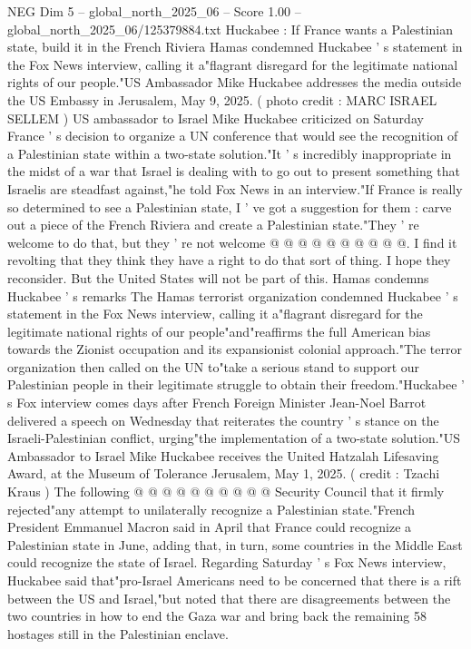 \begin{textsample}{NEG Dim 5 – global\_north\_2025\_06 – Score 1.00 – global\_north\_2025\_06/125379884.txt}  \label{ex:f5_neg_389}
Huckabee : If France wants a Palestinian state, build it in the French Riviera Hamas condemned Huckabee ' s statement in the Fox News interview, calling it a"flagrant disregard for the legitimate national rights of our people."US Ambassador Mike Huckabee addresses the media outside the US Embassy in Jerusalem, May 9, 2025. ( photo credit : MARC ISRAEL SELLEM ) US ambassador to Israel Mike Huckabee criticized on Saturday France ' s decision to organize a UN conference that would see the recognition of a Palestinian state within a two-state solution."It ' s incredibly inappropriate in the midst of a war that Israel is dealing with to go out to present something that Israelis are steadfast against,"he told Fox News in an interview."If France is really so determined to see a Palestinian state, I ' ve got a suggestion for them : carve out a piece of the French Riviera and create a Palestinian state."They ' re welcome to do that, but they ' re not welcome @ @ @ @ @ @ @ @ @ @.
I find it revolting that they think they have a right to do that sort of thing.
I hope they reconsider.
But the United States will not be part of this.
Hamas condemns Huckabee ' s remarks The Hamas terrorist organization condemned Huckabee ' s statement in the Fox News interview, calling it a"flagrant disregard for the legitimate national rights of our people"and"reaffirms the full American bias towards the Zionist occupation and its expansionist colonial approach."The terror organization then called on the UN to"take a serious stand to support our Palestinian people in their legitimate struggle to obtain their freedom."Huckabee ' s Fox interview comes days after French Foreign Minister Jean-Noel Barrot delivered a speech on Wednesday that reiterates the country ' s stance on the Israeli-Palestinian conflict, urging"the implementation of a two-state solution."US Ambassador to Israel Mike Huckabee receives the United Hatzalah Lifesaving Award, at the Museum of Tolerance Jerusalem, May 1, 2025. ( credit : Tzachi Kraus ) The following @ @ @ @ @ @ @ @ @ @ Security Council that it firmly rejected"any attempt to unilaterally recognize a Palestinian state."French President Emmanuel Macron said in April that France could recognize a Palestinian state in June, adding that, in turn, some countries in the Middle East could recognize the state of Israel.
Regarding Saturday ' s Fox News interview, Huckabee said that"pro-Israel Americans need to be concerned that there is a rift between the US and Israel,"but noted that there are disagreements between the two countries in how to end the Gaza war and bring back the remaining 58 hostages still in the Palestinian enclave.

\end{textsample}
